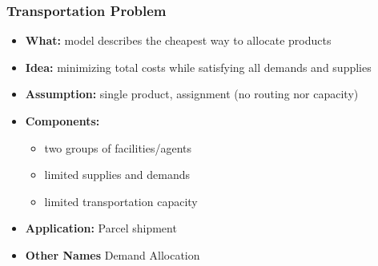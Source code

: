 \documentclass[10pt,handout,notes=show]{beamer}
\begin{document}
\begin{frame}
  \frametitle{Transportation Problem  }

  \begin{itemize}
    \item \textbf{What:} model describes the cheapest way to  \alert{allocate} products
    \item \textbf{Idea:} minimizing total costs while satisfying all demands and supplies
    \item \textbf{Assumption:} \alert{single product}, \alert{assignment} (no routing nor capacity)
    \item \textbf{Components:}
    \begin{itemize}
        \item two groups of facilities/agents
        \item limited supplies and demands
        \item limited transportation capacity \NextLine
    \end{itemize}
    \item \textbf{Application:} Parcel shipment
    \item \textbf{Other Names} Demand Allocation
  \end{itemize}


\end{frame}
\end{document}
